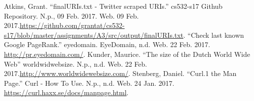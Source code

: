 \documentclass[letterpaper,11pt]{article}
\begin{document}
\clearpage


\begin{thebibliography}{9}
Atkins, Grant. ``finalURIs.txt - Twitter scraped URIs.'' cs532-s17 Github Repository. N.p., 09 Feb. 2017. Web. 09 Feb. 2017.\url{https://github.com/grantat/cs532-s17/blob/master/assignments/A3/src/output/finalURIs.txt}.
``Check last known Google PageRank.'' eyedomain. EyeDomain, n.d. Web. 22 Feb. 2017. \url{http://pr.eyedomain.com/}.
Kunder, Maurice. ``The size of the Dutch World Wide Web'' worldwidwebsize. N.p., n.d. Web. 22 Feb. 2017.\url{http://www.worldwidewebsize.com/}.
Stenberg, Daniel. ``Curl.1 the Man Page.'' Curl - How To Use. N.p., n.d. Web. 24 Jan. 2017. \url{https://curl.haxx.se/docs/manpage.html}.
\end{thebibliography}
\end{document}
